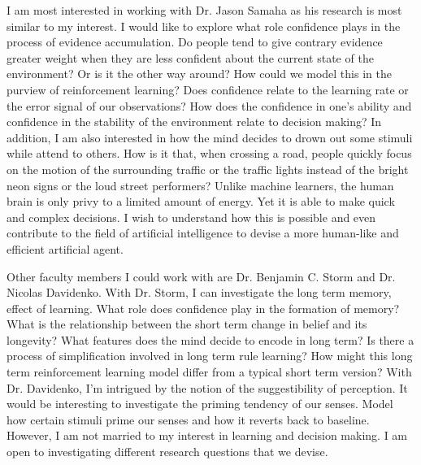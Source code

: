\documentclass[12pt]{article}
\begin{document}
	I am most interested in working with Dr. Jason Samaha as his research is most similar to my interest. I would like to explore what role confidence plays in the process of evidence accumulation. Do people tend to give contrary evidence greater weight when they are less confident about the current state of the environment? Or is it the other way around? How could we model this in the purview of reinforcement learning? Does confidence relate to the learning rate or the error signal of our observations? How does the confidence in one’s ability and confidence in the stability of the environment relate to decision making? In addition, I am also interested in how the mind decides to drown out some stimuli while attend to others. How is it that, when crossing a road, people quickly focus on the motion of the surrounding traffic or the traffic lights instead of the bright neon signs or the loud street performers? Unlike machine learners, the human brain is only privy to a limited amount of energy. Yet it is able to make quick and complex decisions. I wish to understand how this is possible and even contribute to the field of artificial intelligence to devise a more human-like and efficient artificial agent.
	
	Other faculty members I could work with are Dr. Benjamin C. Storm and Dr. Nicolas Davidenko. With Dr. Storm, I can investigate the long term memory, effect of learning. What role does confidence play in the formation of memory? What is the relationship between the short term change in belief and its longevity? What features does the mind decide to encode in long term? Is there a process of simplification involved in long term rule learning? How might this long term reinforcement learning model differ from a typical short term version? With Dr. Davidenko, I’m intrigued by the notion of the suggestibility of perception. It would be interesting to investigate the priming tendency of our senses. Model how certain stimuli prime our senses and how it reverts back to baseline. However, I am not married to my interest in learning and decision making. I am open to investigating different research questions that we devise.
	
\end{document}
